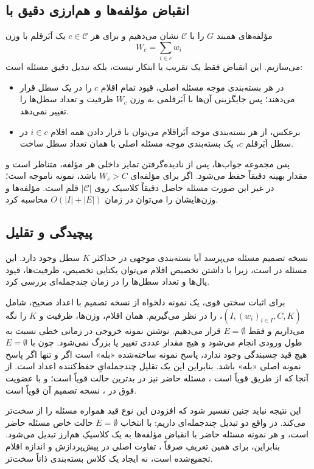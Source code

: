 \subsection{انقباض مؤلفه‌ها و هم‌ارزی دقیق با }\label{subsec:lr_component_based}
مؤلفه‌های همبند $G$ را با $\mathcal{C}$ نشان می‌دهیم و برای هر $c\in\mathcal{C}$ یک اَبَرقلم با وزن
\[
    W_c=\sum_{i\in c} w_i
\]
می‌سازیم. این انقباض فقط یک تقریب یا ابتکار نیست، بلکه تبدیل دقیق مسئله است:
\begin{itemize}
    \item در هر بسته‌بندی موجه مسئله اصلی، قیود  تمام اقلام $c$ را در یک سطل قرار می‌دهند؛ پس جایگزینی آن‌ها با اَبَرقلمی به وزن $W_c$ ظرفیت و تعداد سطل‌ها را تغییر نمی‌دهد.
    \item برعکس، از هر بسته‌بندی موجه اَبَراقلام می‌توان با قرار دادن همه اقلام $i\in c$ در سطل اَبَرقلم $c$، یک بسته‌بندی موجه مسئله اصلی با همان تعداد سطل ساخت.
\end{itemize}
پس مجموعه جواب‌ها، پس از نادیده‌گرفتن تمایز داخلی هر مؤلفه، متناظر است و مقدار بهینه دقیقاً حفظ می‌شود. اگر برای مؤلفه‌ای $W_c>C$ باشد، نمونه ناموجه است؛ در غیر این صورت مسئله حاصل دقیقاً  کلاسیک روی $|\mathcal{C}|$ قلم است. مؤلفه‌ها و وزن‌هایشان را می‌توان در زمان $O(|I|+|E|)$ محاسبه کرد.

\subsection{پیچیدگی و تقلیل}\label{subsec:lr_np_hardness}
نسخه تصمیم مسئله می‌پرسد آیا بسته‌بندی موجهی در حداکثر $K$ سطل وجود دارد. این مسئله در  است، زیرا با داشتن تخصیص اقلام می‌توان یکتایی تخصیص، ظرفیت‌ها، قیود یال‌ها و تعداد سطل‌ها را در زمان چندجمله‌ای بررسی کرد.

برای اثبات سختی قوی، یک نمونه دلخواه از نسخه تصمیم  با اعداد صحیح، شامل $(I,(w_i)_{i\in I},C,K)$، را در نظر می‌گیریم. همان اقلام، وزن‌ها، ظرفیت و $K$ را نگه می‌داریم و فقط $E=\emptyset$ قرار می‌دهیم. نوشتن نمونه خروجی در زمانی خطی نسبت به طول ورودی انجام می‌شود و هیچ مقدار عددی تغییر یا بزرگ نمی‌شود. چون با $E=\emptyset$ هیچ قید چسبندگی وجود ندارد، پاسخ نمونه ساخته‌شده «بله» است اگر و تنها اگر پاسخ نمونه اصلی  «بله» باشد. بنابراین این یک تقلیل چندجمله‌ایِ حفظ‌کننده اعداد است. از آنجا که  از طریق  قویاً  است \cite{GareyJohnson1979}، مسئله حاضر نیز در بدترین حالت قویاً  است؛ و با عضویت فوق در ، نسخه تصمیم آن قویاً  است.

این نتیجه نباید چنین تفسیر شود که افزودن این نوع قید همواره مسئله را از  سخت‌تر می‌کند. در واقع دو تبدیل چندجمله‌ای داریم:  با انتخاب $E=\emptyset$ حالت خاص مسئله حاضر است، و هر نمونه مسئله حاضر با انقباض مؤلفه‌ها به یک  کلاسیکِ هم‌ارز تبدیل می‌شود. بنابراین، برای همین تعریفِ صرفاً ، تفاوت اصلی در پیش‌پردازش و اندازه اقلام تجمیع‌شده است، نه ایجاد یک کلاس بسته‌بندی ذاتاً سخت‌تر.

